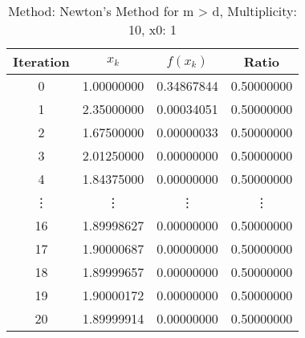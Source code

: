 \begin{table}
\centering
\caption{Method: Newton's Method for m > d, Multiplicity: 10, x0: 1}
\label{tab:table_Newton's_Method_for_m_>_d_10_1}
\begin{tabular}{c c c c}
\toprule
Iteration &      $x_k$ &   $f(x_k)$ &      Ratio \\
\midrule
        0 & 1.00000000 & 0.34867844 & 0.50000000 \\
        1 & 2.35000000 & 0.00034051 & 0.50000000 \\
        2 & 1.67500000 & 0.00000033 & 0.50000000 \\
        3 & 2.01250000 & 0.00000000 & 0.50000000 \\
        4 & 1.84375000 & 0.00000000 & 0.50000000 \\
   \vdots &     \vdots &     \vdots &     \vdots \\
       16 & 1.89998627 & 0.00000000 & 0.50000000 \\
       17 & 1.90000687 & 0.00000000 & 0.50000000 \\
       18 & 1.89999657 & 0.00000000 & 0.50000000 \\
       19 & 1.90000172 & 0.00000000 & 0.50000000 \\
       20 & 1.89999914 & 0.00000000 & 0.50000000 \\
\bottomrule
\end{tabular}
\end{table}
